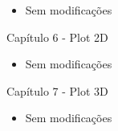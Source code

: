 \documentclass[10pt,a4paper]{report}
\begin{document}
\begin{itemize}

\item Sem modificações

% 

\end{itemize}


\vspace{0.5cm}
\noindent
{\large Capítulo 6 - Plot 2D}


\begin{itemize}
\item Sem modificações

% 
\end{itemize}



\vspace{0.5cm}
\noindent
{\large Capítulo 7 - Plot 3D}


\begin{itemize}
 \item Sem modificações
\end{itemize}
\end{document}
